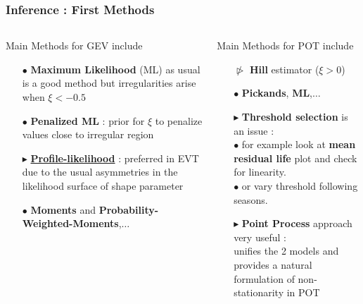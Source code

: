 \documentclass[9pt,xcolor={dvipsnames}]{beamer}
\begin{document}
\begin{frame}\frametitle{Inference : First Methods}\fontsize{8.5}{9}\selectfont
	
	\vspace{1cm}
	\begin{columns}
		\begin{column}{.5\textwidth}
		\vspace{-.8cm}
\begin{block}{ Main Methods for GEV include}
\begin{itemize}
	\item[$\bullet$] \textbf{Maximum Likelihood} (ML) as usual is a good method but irregularities arise when $\xi<-0.5$

	\item[$\bullet$] \textbf{Penalized ML} : prior for $\xi$ to penalize values close to irregular region
\quad\item[$\blacktriangleright$] \textbf{\underline{Profile-likelihood}} : preferred in EVT due to the usual asymmetries in the likelihood surface of shape parameter

	\item[$\bullet$] \textbf{Moments} and \textbf{Probability-Weighted-Moments},$\dots$
\end{itemize}
\end{block}
		\end{column}
		\begin{column}{.5\textwidth}
				\vspace{-.8cm}
\begin{block}{ Main Methods for POT include}
	\begin{itemize}
		\item[$\ntriangleright$] \textbf{Hill} estimator ($\xi>0$)
		\item[$\bullet$] \textbf{Pickands}, \textbf{ML},$\dots$
		\item[$\blacktriangleright$] \textbf{Threshold selection }is an issue : \\ $\bullet$ for example look at \textbf{mean residual life} plot and check for linearity. \\
		$\bullet$ or vary threshold following seasons.
 	\item[$\blacktriangleright$] \textbf{Point Process} approach very useful : \\
 	unifies the 2 models and provides a natural formulation of non-stationarity in POT
	
	\end{itemize}
\end{block}
		\end{column}
\end{columns}


\end{frame}
\end{document}
